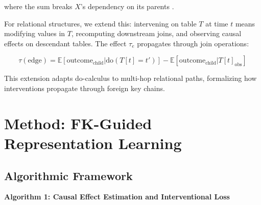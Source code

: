 \documentclass[11pt,letterpaper]{article}
\begin{document}
where the sum breaks $X$'s dependency on its parents \cite{Pearl2009}.

For relational structures, we extend this: intervening on table $T$ at time $t$ means modifying values in $T$, recomputing downstream joins, and observing causal effects on descendant tables. The effect $\tau_e$ propagates through join operations:

$$\tau(\text{edge}) = \mathbb{E}[\text{outcome}_{\text{child}} | \text{do}(T[t] = t')] - \mathbb{E}[\text{outcome}_{\text{child}} | T[t]_{\text{obs}}]$$

This extension adapts do-calculus to multi-hop relational paths, formalizing how interventions propagate through foreign key chains.

\section{Method: FK-Guided Representation Learning}

\subsection{Algorithmic Framework}

\textbf{Algorithm 1: Causal Effect Estimation and Interventional Loss}
\end{document}
